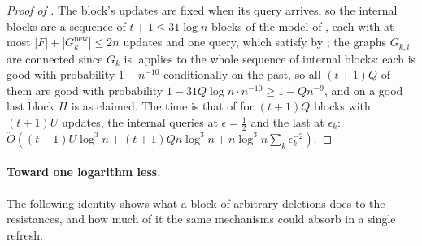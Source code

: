 \documentclass[11pt]{article}
\theoremstyle{remark}
\newcommand{\Gnew}{G^{\mathrm{new}}}
\newcommand{\Odouble}{\ddot{O}}
\begin{document}
\begin{proof}[Proof of ]
The block's updates are fixed when its query arrives, so the internal
blocks are a sequence of $t+1\le31\log n$ blocks of the model of
, each with at most $|F|+|\Gnew_k|\le2n$ updates and one
query, which satisfy  by ; the graphs
$G_{k,i}$ are connected since $G_k$ is.
 applies to the whole sequence of internal blocks: each is
good with probability $1-n^{-10}$ conditionally on the past, so all
$(t+1)Q$ of them are good with probability $1-31Q\log n\cdot n^{-10}\ge1-Qn^{-9}$,
and on a good last block $H$ is as claimed.
The time is that of  for $(t+1)Q$ blocks with
$(t+1)U$ updates, the internal queries at $\epsilon=\frac12$ and the last at
$\epsilon_k$: $\Odouble((t+1)U\log^{3}n+(t+1)Qn\log^{3}n+n\log^{3}n\sum_k\epsilon_k^{-2})$.
\end{proof}

\paragraph{Toward one logarithm less.}
The following identity shows what a block of arbitrary deletions does to
the resistances, and how much of it the same mechanisms could absorb in a
single refresh.
\end{document}
